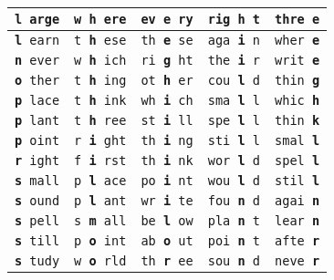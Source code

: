 \documentclass[]{article}
\begin{document}
\begin{tabular}{|l|l|l|l|l|}
\hline \rule[-1ex]{0pt}{3.5ex} \texttt{\textbf{l} arge} & \texttt{w \textbf{h} ere} & \texttt{ev \textbf{e} ry} & \texttt{rig \textbf{h} t} & \texttt{thre \textbf{e}} \\
\hline \rule[-1ex]{0pt}{3.5ex} \texttt{\textbf{l} earn} & \texttt{t \textbf{h} ese} & \texttt{th \textbf{e} se} & \texttt{aga \textbf{i} n} & \texttt{wher \textbf{e}} \\
\hline \rule[-1ex]{0pt}{3.5ex} \texttt{\textbf{n} ever} & \texttt{w \textbf{h} ich} & \texttt{ri \textbf{g} ht} & \texttt{the \textbf{i} r} & \texttt{writ \textbf{e}} \\
\hline \rule[-1ex]{0pt}{3.5ex} \texttt{\textbf{o} ther} & \texttt{t \textbf{h} ing} & \texttt{ot \textbf{h} er} & \texttt{cou \textbf{l} d} & \texttt{thin \textbf{g}} \\
\hline \rule[-1ex]{0pt}{3.5ex} \texttt{\textbf{p} lace} & \texttt{t \textbf{h} ink} & \texttt{wh \textbf{i} ch} & \texttt{sma \textbf{l} l} & \texttt{whic \textbf{h}} \\
\hline \rule[-1ex]{0pt}{3.5ex} \texttt{\textbf{p} lant} & \texttt{t \textbf{h} ree} & \texttt{st \textbf{i} ll} & \texttt{spe \textbf{l} l} & \texttt{thin \textbf{k}} \\
\hline \rule[-1ex]{0pt}{3.5ex} \texttt{\textbf{p} oint} & \texttt{r \textbf{i} ght} & \texttt{th \textbf{i} ng} & \texttt{sti \textbf{l} l} & \texttt{smal \textbf{l}} \\
\hline \rule[-1ex]{0pt}{3.5ex} \texttt{\textbf{r} ight} & \texttt{f \textbf{i} rst} & \texttt{th \textbf{i} nk} & \texttt{wor \textbf{l} d} & \texttt{spel \textbf{l}} \\
\hline \rule[-1ex]{0pt}{3.5ex} \texttt{\textbf{s} mall} & \texttt{p \textbf{l} ace} & \texttt{po \textbf{i} nt} & \texttt{wou \textbf{l} d} & \texttt{stil \textbf{l}} \\
\hline \rule[-1ex]{0pt}{3.5ex} \texttt{\textbf{s} ound} & \texttt{p \textbf{l} ant} & \texttt{wr \textbf{i} te} & \texttt{fou \textbf{n} d} & \texttt{agai \textbf{n}} \\
\hline \rule[-1ex]{0pt}{3.5ex} \texttt{\textbf{s} pell} & \texttt{s \textbf{m} all} & \texttt{be \textbf{l} ow} & \texttt{pla \textbf{n} t} & \texttt{lear \textbf{n}} \\
\hline \rule[-1ex]{0pt}{3.5ex} \texttt{\textbf{s} till} & \texttt{p \textbf{o} int} & \texttt{ab \textbf{o} ut} & \texttt{poi \textbf{n} t} & \texttt{afte \textbf{r}} \\
\hline \rule[-1ex]{0pt}{3.5ex} \texttt{\textbf{s} tudy} & \texttt{w \textbf{o} rld} & \texttt{th \textbf{r} ee} & \texttt{sou \textbf{n} d} & \texttt{neve \textbf{r}} \\

\end{tabular}
\end{document}
